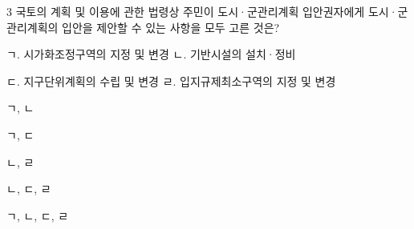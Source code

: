 \begin{question}{3}
국토의 계획 및 이용에 관한 법령상 주민이 도시·군관리계획 입안권자에게 도시·군관리계획의 입안을 제안할 수 있는 사항을 모두 고른 것은?
\begin{framedtext}
ㄱ. 시가화조정구역의 지정 및 변경 \hfill ㄴ. 기반시설의 설치·정비 \par
ㄷ. 지구단위계획의 수립 및 변경 \hfill ㄹ. 입지규제최소구역의 지정 및 변경 \par
\end{framedtext}
\begin{choices}
  \item ㄱ, ㄴ
  \item ㄱ, ㄷ
  \item ㄴ, ㄹ
  \item ㄴ, ㄷ, ㄹ
  \item ㄱ, ㄴ, ㄷ, ㄹ
\end{choices}
\end{question}
